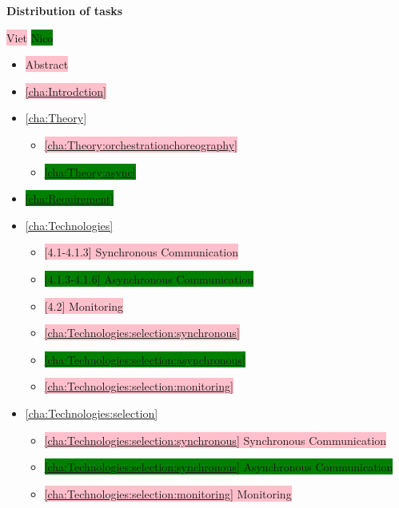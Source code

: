 
\textbf{Distribution of tasks}

\colorbox{pink}{Viet}
\colorbox{green}{Nico}
\begin{itemize}
	\item \colorbox{pink}{Abstract}
	\item \colorbox{pink}{\ref{cha:Introdction} }
	\item \ref{cha:Theory} 
	      \begin{itemize}
		      \item \colorbox{pink}{\ref{cha:Theory:orchestrationchoreography}}
		      \item \colorbox{green}{\ref{cha:Theory:async}}
	      \end{itemize}
	\item \colorbox{green}{\ref{cha:Requirement} }
	\item \ref{cha:Technologies} 
	      \begin{itemize}
		      \item \colorbox{pink}{[4.1-4.1.3] Synchronous Communication}
		      \item \colorbox{green}{[4.1.3-4.1.6] Asynchronous Communication}
		      \item \colorbox{pink}{[4.2] Monitoring}
		      \item \colorbox{pink}{\ref{cha:Technologies:selection:synchronous}}
		      \item \colorbox{green}{\ref{cha:Technologies:selection:asynchronous}}
		      \item \colorbox{pink}{\ref{cha:Technologies:selection:monitoring}}
	      \end{itemize}
	\item\ref{cha:Technologies:selection} 
	      \begin{itemize}
		      \item \colorbox{pink}{\ref{cha:Technologies:selection:synchronous} Synchronous Communication}
		      \item \colorbox{green}{\ref{cha:Technologies:selection:synchronous} Asynchronous Communication}
		      \item \colorbox{pink}{\ref{cha:Technologies:selection:monitoring} Monitoring}

\end{itemize}
\end{itemize}
